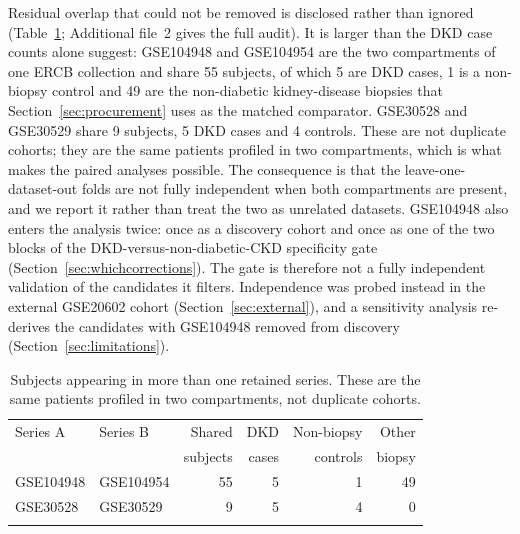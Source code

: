 \documentclass[pdflatex,sn-vancouver-num]{sn-jnl}
\theoremstyle{thmstyleone}
\theoremstyle{thmstyletwo}
\theoremstyle{thmstylethree}
\begin{document}
Residual overlap that could not be removed is disclosed rather than ignored (Table~\ref{tab:overlap}; Additional file~2 gives the full audit). It is larger than the DKD case counts alone suggest: GSE104948 and GSE104954 are the two compartments of one ERCB collection and share 55 subjects, of which 5 are DKD cases, 1 is a non-biopsy control and 49 are the non-diabetic kidney-disease biopsies that Section~\ref{sec:procurement} uses as the matched comparator. GSE30528 and GSE30529 share 9 subjects, 5 DKD cases and 4 controls. These are not duplicate cohorts; they are the same patients profiled in two compartments, which is what makes the paired analyses possible. The consequence is that the leave-one-dataset-out folds are not fully independent when both compartments are present, and we report it rather than treat the two as unrelated datasets. GSE104948 also enters the analysis twice: once as a discovery cohort and once as one of the two blocks of the DKD-versus-non-diabetic-CKD specificity gate (Section~\ref{sec:whichcorrections}). The gate is therefore not a fully independent validation of the candidates it filters. Independence was probed instead in the external GSE20602 cohort (Section~\ref{sec:external}), and a sensitivity analysis re-derives the candidates with GSE104948 removed from discovery (Section~\ref{sec:limitations}).

\begin{table}[h]
\caption{Subjects appearing in more than one retained series. These are the same patients profiled in two compartments, not duplicate cohorts.}\label{tab:overlap}
\begin{tabular}{@{}llrrrr@{}}
\toprule
Series A & Series B & Shared & DKD & Non-biopsy & Other \\
        &          & subjects & cases & controls & biopsy \\
\midrule
GSE104948 & GSE104954 & 55 & 5 & 1 & 49 \\
GSE30528 & GSE30529 & 9 & 5 & 4 & 0 \\
\botrule
\end{tabular}
\end{table}
\end{document}
